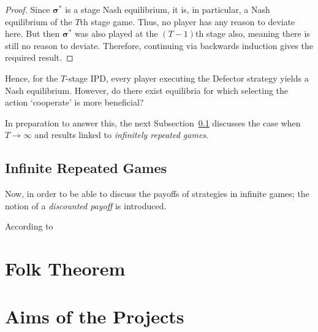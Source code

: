 \begin{proof}
    Since \(\bm\sigma^{*}\) is a stage Nash equilibrium, it is, in particular,
    a Nash equilibrium of the \(T\)th stage game. Thus, no player has any reason
    to deviate here. But then \(\bm\sigma^{*}\) was also played at the
    \((T-1)\)th stage also, meaning there is still no reason to deviate.
    Therefore, continuing via backwards induction gives the required result.
\end{proof}

Hence, for the \(T\)-stage IPD, every player executing the Defector strategy
yields a Nash equilibrium. However, do there exist equilibria for which
selecting the action `cooperate' is more beneficial?

In preparation to answer this, the next
Subsection~\ref{subsec:Infinite_Repeated_Games} discusses the case when \(T \to
\infty\) and results linked to \emph{infinitely repeated games}.

\subsection{Infinite Repeated Games}\label{subsec:Infinite_Repeated_Games}
Now, in order to be able to discuss the payoffs of strategies in infinite games;
the notion of a \emph{discounted payoff} is introduced.

According to 


\section{Folk Theorem}\label{sec:Folk_Thm}



\section{Aims of the Projects}\label{sec:Aims_of_the_Project}